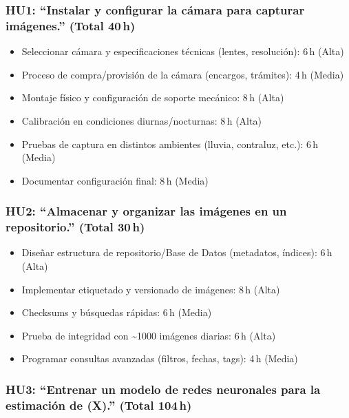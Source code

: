 \documentclass[
11pt, %
]{ProyectoVpC}
\begin{document}
\subsubsection*{HU1: “Instalar y configurar la cámara para capturar imágenes.” (Total 40\,h)}

\begin{itemize}
  \item Seleccionar cámara y especificaciones técnicas (lentes, resolución): 6\,h (Alta)
  \item Proceso de compra/provisión de la cámara (encargos, trámites): 4\,h (Media)
  \item Montaje físico y configuración de soporte mecánico: 8\,h (Alta)
  \item Calibración en condiciones diurnas/nocturnas: 8\,h (Alta)
  \item Pruebas de captura en distintos ambientes (lluvia, contraluz, etc.): 6\,h (Media)
  \item Documentar configuración final: 8\,h (Media)
\end{itemize}

\subsubsection*{HU2: “Almacenar y organizar las imágenes en un repositorio.” (Total 30\,h)}

\begin{itemize}
  \item Diseñar estructura de repositorio/Base de Datos (metadatos, índices): 6\,h (Alta)
  \item Implementar etiquetado y versionado de imágenes: 8\,h (Alta)
  \item Checksums y búsquedas rápidas: 6\,h (Media)
  \item Prueba de integridad con \textasciitilde1000 imágenes diarias: 6\,h (Alta)
  \item Programar consultas avanzadas (filtros, fechas, tags): 4\,h (Media)
\end{itemize}

\subsubsection*{HU3: “Entrenar un modelo de redes neuronales para la estimación de (X).” (Total 104\,h)}
\end{document}
